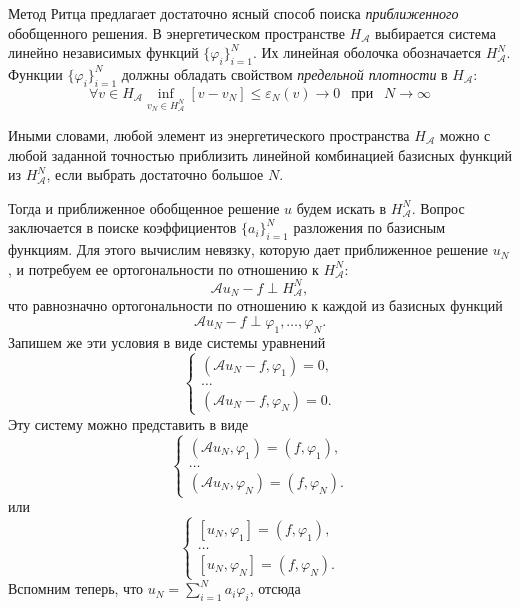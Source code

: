 \documentclass[a4paper, 11pt]{article}
\begin{document}
Метод Ритца предлагает достаточно ясный способ поиска \textit{приближенного} обобщенного решения. В энергетическом пространстве $H_\mathcal{A}$ выбирается система линейно независимых функций $\{\varphi_i\}_{i=1}^N$. Их линейная оболочка обозначается $H_{\mathcal{A}}^N$. Функции $\{\varphi_i\}_{i=1}^N$ должны обладать свойством \textit{предельной плотности} в $H_\mathcal{A}$:
\begin{equation}\label{eq:ritz_lim_dens}
\forall v \in H_\mathcal{A}
\inf_{v_N \in H_{\mathcal{A}}^N}[v - v_N] \le \varepsilon_N(v) \rightarrow 0~~\text{ при } ~~N \rightarrow \infty
\end{equation}

Иными словами, любой элемент из энергетического пространства $H_\mathcal{A}$ можно с любой заданной точностью приблизить линейной комбинацией базисных функций из $H_\mathcal{A}^N$, если выбрать достаточно большое $N$.

Тогда и приближенное обобщенное решение $u$ будем искать в  $H_{\mathcal{A}}^N$. Вопрос заключается в поиске коэффициентов $\{a_i\}_{i=1}^N$ разложения по базисным функциям. Для этого вычислим невязку, которую дает приближенное решение $u_N$, и потребуем ее ортогональности по отношению к $H_{\mathcal{A}}^N$:
\begin{equation}
\mathcal{A}u_N - f \perp H_{\mathcal{A}}^N,
\end{equation}
что равнозначно ортогональности по отношению к каждой из базисных функций
\begin{equation}
\mathcal{A}u_N - f \perp \varphi_1, \dots, \varphi_N.
\end{equation}
Запишем же эти условия в виде системы уравнений
\begin{equation}
\begin{cases}
\left(\mathcal{A}u_N - f, \varphi_1\right) = 0,\\
\dots \\
\left(\mathcal{A}u_N - f, \varphi_N\right) = 0.
\end{cases}
\end{equation}
Эту систему можно представить в виде
\begin{equation}
\begin{cases}
\left(\mathcal{A}u_N, \varphi_1\right) = (f,\varphi_1),\\
\dots \\
\left(\mathcal{A}u_N, \varphi_N\right) = (f,\varphi_N).
\end{cases}
\end{equation}
или
\begin{equation}
\begin{cases}
[u_N, \varphi_1] = (f,\varphi_1),\\
\dots \\
[u_N, \varphi_N] = (f,\varphi_N).
\end{cases}
\end{equation}
Вспомним теперь, что $u_N = \sum_{i=1}^Na_i\varphi_i$, отсюда
\end{document}
